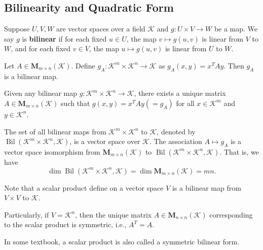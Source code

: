 \documentclass{ctexart}
\newcommand{\M}{\mathbf{M}}
\begin{document}
    \subsection{Bilinearity and Quadratic Form}
    \begin{mydef}
        Suppose $U,V,W$ are vector spaces over a field $\mathcal{K}$ and $g: U \times V \to W$ be a map. We say $g$ is \textbf{bilinear} if for each fixed $u \in U$, the map $v \mapsto g(u,v)$ is linear from $V$ to $W$, and for each fixed $v \in V$, the map $u \mapsto g(u,v)$ is linear from $U$ to $W$.
    \end{mydef}
    \begin{myex}
        Let $A \in \mathbf{M}_{m \times n}(\mathcal{K})$. Define $g_A: \mathcal{K}^m \times \mathcal{K}^n \to \mathcal{K}$ as $g_A(x,y) = x^T A y$. Then $g_A$ is a bilinear map.
    \end{myex}
    \begin{mythm}
        Given any bilinear map $g: \mathcal{K}^m \times \mathcal{K}^n \to \mathcal{K}$, there exists a unique matrix $A \in \mathbf{M}_{m \times n}(\mathcal{K})$ such that $g(x,y) = x^T A y \left(=g_A\right)$ for all $x\in \mathcal{K}^m$ and $y\in \mathcal{K}^n$.
    \end{mythm}
    \begin{mythm}
        The set of all bilinear maps from $\mathcal{K}^m \times \mathcal{K}^n$ to $\mathcal{K}$, denoted by $\operatorname{Bil}(\mathcal{K}^m \times \mathcal{K}^n, \mathcal{K})$, is a vector space over $\mathcal{K}$. The association $A \mapsto g_A$ is a vector space isomorphism from $\mathbf{M}_{m \times n}(\mathcal{K})$ to $\operatorname{Bil}(\mathcal{K}^m \times \mathcal{K}^n, \mathcal{K})$. That is, we have
        \[
        \dim \operatorname{Bil}(\mathcal{K}^m \times \mathcal{K}^n, \mathcal{K}) = \dim \mathbf{M}_{m \times n}(\mathcal{K}) = mn.
        \]
    \end{mythm}
    \begin{myrmk}
        Note that a scalar product define on a vector space $V$ is a bilinear map from $V \times V$ to $\mathcal{K}$. 
        
        Particularly, if $V = \mathcal{K}^n$, then the unique matrix $A\in \M_{n \times n}(\mathcal{K})$ corresponding to the scalar product is symmetric, i.e., $A^T = A$.
    \end{myrmk}
    \begin{myrmk}
        In some textbook, a scalar product is also called a symmetric bilinear form.
    \end{myrmk}
\end{document}
